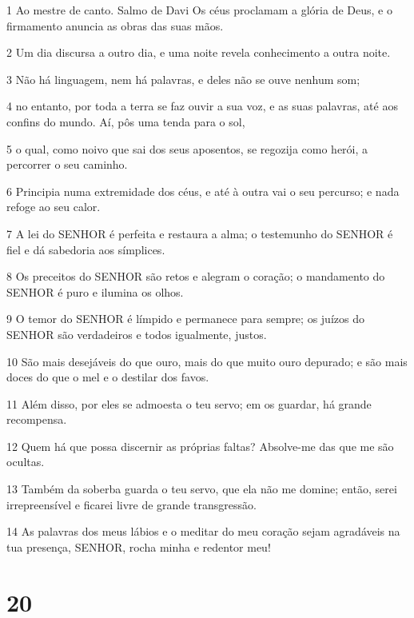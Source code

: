 \par 1 Ao mestre de canto. Salmo de Davi Os céus proclamam a glória de Deus, e o firmamento anuncia as obras das suas mãos.
\par 2 Um dia discursa a outro dia, e uma noite revela conhecimento a outra noite.
\par 3 Não há linguagem, nem há palavras, e deles não se ouve nenhum som;
\par 4 no entanto, por toda a terra se faz ouvir a sua voz, e as suas palavras, até aos confins do mundo. Aí, pôs uma tenda para o sol,
\par 5 o qual, como noivo que sai dos seus aposentos, se regozija como herói, a percorrer o seu caminho.
\par 6 Principia numa extremidade dos céus, e até à outra vai o seu percurso; e nada refoge ao seu calor.
\par 7 A lei do SENHOR é perfeita e restaura a alma; o testemunho do SENHOR é fiel e dá sabedoria aos símplices.
\par 8 Os preceitos do SENHOR são retos e alegram o coração; o mandamento do SENHOR é puro e ilumina os olhos.
\par 9 O temor do SENHOR é límpido e permanece para sempre; os juízos do SENHOR são verdadeiros e todos igualmente, justos.
\par 10 São mais desejáveis do que ouro, mais do que muito ouro depurado; e são mais doces do que o mel e o destilar dos favos.
\par 11 Além disso, por eles se admoesta o teu servo; em os guardar, há grande recompensa.
\par 12 Quem há que possa discernir as próprias faltas? Absolve-me das que me são ocultas.
\par 13 Também da soberba guarda o teu servo, que ela não me domine; então, serei irrepreensível e ficarei livre de grande transgressão.
\par 14 As palavras dos meus lábios e o meditar do meu coração sejam agradáveis na tua presença, SENHOR, rocha minha e redentor meu!

\chapter{20}


